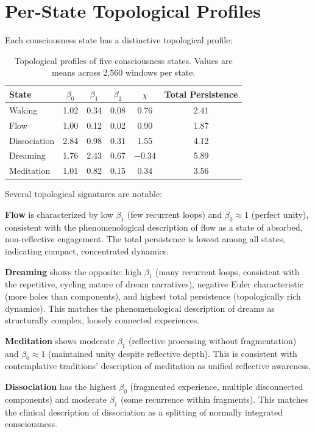\documentclass[12pt]{book}
\begin{document}
\section{Per-State Topological Profiles}

Each consciousness state has a distinctive topological profile:

\begin{table}[H]
\centering
\caption{Topological profiles of five consciousness states. Values are means across 2,560 windows per state.}
\label{tab:topo-profiles}
\begin{tabular}{lccccc}
\toprule
\textbf{State} & \textbf{$\beta_0$} & \textbf{$\beta_1$} & \textbf{$\beta_2$} & \textbf{$\chi$} & \textbf{Total Persistence} \\
\midrule
Waking & 1.02 & 0.34 & 0.08 & 0.76 & 2.41 \\
Flow & 1.00 & 0.12 & 0.02 & 0.90 & 1.87 \\
Dissociation & 2.84 & 0.98 & 0.31 & 1.55 & 4.12 \\
Dreaming & 1.76 & 2.43 & 0.67 & $-0.34$ & 5.89 \\
Meditation & 1.01 & 0.82 & 0.15 & 0.34 & 3.56 \\
\bottomrule
\end{tabular}
\end{table}

Several topological signatures are notable:

\textbf{Flow} is characterized by low $\beta_1$ (few recurrent loops) and $\beta_0 \approx 1$ (perfect unity), consistent with the phenomenological description of flow as a state of absorbed, non-reflective engagement. The total persistence is lowest among all states, indicating compact, concentrated dynamics.

\textbf{Dreaming} shows the opposite: high $\beta_1$ (many recurrent loops, consistent with the repetitive, cycling nature of dream narratives), negative Euler characteristic (more holes than components), and highest total persistence (topologically rich dynamics). This matches the phenomenological description of dreams as structurally complex, loosely connected experiences.

\textbf{Meditation} shows moderate $\beta_1$ (reflective processing without fragmentation) and $\beta_0 \approx 1$ (maintained unity despite reflective depth). This is consistent with contemplative traditions' description of meditation as unified reflective awareness.

\textbf{Dissociation} has the highest $\beta_0$ (fragmented experience, multiple disconnected components) and moderate $\beta_1$ (some recurrence within fragments). This matches the clinical description of dissociation as a splitting of normally integrated consciousness.
\end{document}
